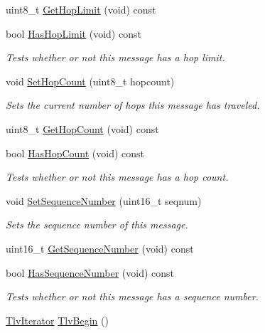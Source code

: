 \begin{DoxyCompactItemize}
uint8\+\_\+t \hyperlink{classns3_1_1PbbMessage_a938893c819b1f04baa8738cbc3ea6d19}{Get\+Hop\+Limit} (void) const 
\item 
bool \hyperlink{classns3_1_1PbbMessage_a5bad52e536a9a2116a7f66b3c8d2054b}{Has\+Hop\+Limit} (void) const 
\begin{DoxyCompactList}\small\item\em Tests whether or not this message has a hop limit. \end{DoxyCompactList}\item 
void \hyperlink{classns3_1_1PbbMessage_a882ec7e2e9a9dff6297152c196d54ce4}{Set\+Hop\+Count} (uint8\+\_\+t hopcount)
\begin{DoxyCompactList}\small\item\em Sets the current number of hops this message has traveled. \end{DoxyCompactList}\item 
uint8\+\_\+t \hyperlink{classns3_1_1PbbMessage_a1941a4d881175d211f12970b54ceb483}{Get\+Hop\+Count} (void) const 
\item 
bool \hyperlink{classns3_1_1PbbMessage_ac6c535503fda3849f8ab99792416efd2}{Has\+Hop\+Count} (void) const 
\begin{DoxyCompactList}\small\item\em Tests whether or not this message has a hop count. \end{DoxyCompactList}\item 
void \hyperlink{classns3_1_1PbbMessage_a8c24696ac67507afa03c9750daccc47d}{Set\+Sequence\+Number} (uint16\+\_\+t seqnum)
\begin{DoxyCompactList}\small\item\em Sets the sequence number of this message. \end{DoxyCompactList}\item 
uint16\+\_\+t \hyperlink{classns3_1_1PbbMessage_a4312b39be08a4091f7bee30978ecdfa2}{Get\+Sequence\+Number} (void) const 
\item 
bool \hyperlink{classns3_1_1PbbMessage_a1b3faaca8d6f9b2ca7c1abe5a7a72d82}{Has\+Sequence\+Number} (void) const 
\begin{DoxyCompactList}\small\item\em Tests whether or not this message has a sequence number. \end{DoxyCompactList}\item 
\hyperlink{classns3_1_1PbbMessage_ac37cff092f8d01346e2d9498b4b34afd}{Tlv\+Iterator} \hyperlink{classns3_1_1PbbMessage_a6379e5ffb0a716b82d63529b64d496c3}{Tlv\+Begin} ()

\end{DoxyCompactItemize}
